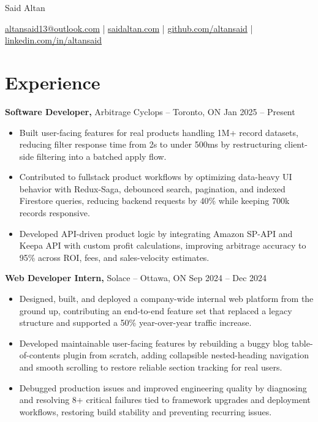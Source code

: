 \documentclass[11pt]{article}       %
\begin{document}
\centerline{\Huge Said Altan}

\vspace{10pt}

\centerline{\href{mailto:altansaid13@outlook.com}{altansaid13@outlook.com} | \href{https://saidaltan.com}{saidaltan.com} | \href{https://github.com/altansaid}{github.com/altansaid} | \href{https://www.linkedin.com/in/altansaid}{linkedin.com/in/altansaid}}


\vspace{5pt}
\section*{Experience}
\textbf{Software Developer,} {Arbitrage Cyclops} -- Toronto, ON \hfill Jan 2025 -- Present \\
\vspace{-9pt}
\begin{itemize}
  \item Built user-facing features for real products handling 1M+ record datasets, reducing filter response time from 2s to under 500ms by restructuring client-side filtering into a batched apply flow.
  \item Contributed to fullstack product workflows by optimizing data-heavy UI behavior with Redux-Saga, debounced search, pagination, and indexed Firestore queries, reducing backend requests by 40\% while keeping 700k records responsive.
  \item Developed API-driven product logic by integrating Amazon SP-API and Keepa API with custom profit calculations, improving arbitrage accuracy to 95\% across ROI, fees, and sales-velocity estimates.
\end{itemize}

\textbf{Web Developer Intern,} {Solace} -- Ottawa, ON \hfill Sep 2024 -- Dec 2024 \\
\vspace{-9pt}
\begin{itemize}
  \item Designed, built, and deployed a company-wide internal web platform from the ground up, contributing an end-to-end feature set that replaced a legacy structure and supported a 50\% year-over-year traffic increase.
  \item Developed maintainable user-facing features by rebuilding a buggy blog table-of-contents plugin from scratch, adding collapsible nested-heading navigation and smooth scrolling to restore reliable section tracking for real users.
  \item Debugged production issues and improved engineering quality by diagnosing and resolving 8+ critical failures tied to framework upgrades and deployment workflows, restoring build stability and preventing recurring issues.
\end{itemize}
\end{document}
